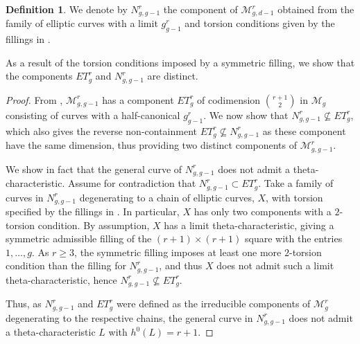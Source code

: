 \documentclass[11pt]{amsart}
\newcommand{\M}{\mathcal{M}}
\newcommand{\g}[2]{g^{#1}_{#2}}
\newcommand{\BN}[3]{\mathcal{M}^{#2}_{#1,#3}}
\newtheorem{theorem}{Theorem}[section]
\theoremstyle{definition}
\newtheorem{defn}[theorem]{Definition}
\theoremstyle{definition}
\begin{document}
\begin{defn}\label{defn_Ncomponent}
	We denote by $N^r_{g,g-1}$ the component of $\BN{g}{r}{d-1}$ obtained from the family of elliptic curves with a limit $\g{r}{g-1}$ and torsion conditions given by the fillings in .
\end{defn}


As a result of the torsion conditions imposed by a symmetric filling, we show that the components $ET^r_g$ and $N^r_{g,g-1}$ are distinct.

\begin{proof}
From , $\M^r_{g,g-1}$ has a component $ET^r_g$ of codimension ${r+1\choose 2}$ in ${\mathcal M}_g$ consisting of curves with a half-canonical $g_{g-1}^r$. We now show that $N^r_{g,g-1}\nsubseteq ET^r_g$, which also gives the reverse non-containment $ET^r_g \nsubseteq N^r_{g,g-1}$ as these component have the same dimension, thus providing two distinct components of $\BN{g}{r}{g-1}$.

We show in fact that the general curve of $N^r_{g,g-1}$ does not admit a theta-characteristic. Assume for contradiction that $N^r_{g,g-1}\subset ET^r_{g}$. Take a family of curves in $N^r_{g,g-1}$ degenerating to a chain of elliptic curves, $X$, with torsion specified by the fillings in . In particular, $X$ has only two components with a $2$-torsion condition. By assumption, $X$ has a limit theta-characteristic, giving a symmetric admissible filling of the $(r+1)\times(r+1)$ square with the entries $1,\dots, g$. As $r\geq 3$, the symmetric filling imposes at least one more $2$-torsion condition than the filling for $N^r_{g,g-1}$, and thus $X$ does not admit such a limit theta-characteristic, hence $N^r_{g,g-1}\nsubseteq ET^r_g$.


Thus, as $N^r_{g,g-1}$ and $ET^r_g$ were defined as the irreducible components of ${\mathcal M}^r_g$ degenerating to the respective chains,
 the general curve in $N^r_{g,g-1}$ does not admit a theta-characteristic $L$ with $h^0(L)=r+1$.
\end{proof}
\end{document}
